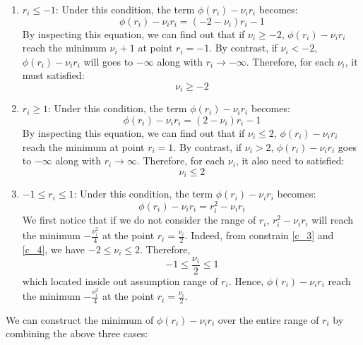 \documentclass[10pt,a4paper]{article}
\begin{document}
\begin{enumerate}
	\item $r_{i} \leq -1$: Under this condition, the term $\phi(r_{i}) - \nu_{i} r_{i}$ becomes:
	\begin{equation*}
		\phi(r_{i}) - \nu_{i} r_{i} = (-2 - \nu_{i}) r_{i} - 1
	\end{equation*}
	By inspecting this equation, we can find out that if $\nu_{i} \geq -2$, $\phi(r_{i}) - \nu_{i} r_{i}$ reach the minimum $\nu_{i} + 1$ at point $r_{i} = -1$. By contrast, if $\nu_{i} < -2$, $\phi(r_{i}) - \nu_{i} r_{i}$ will goes to $-\infty$ along with $r_{i} \rightarrow -\infty$. Therefore, for each $\nu_{i}$, it must satisfied:
	\begin{equation}
		\nu_{i} \geq -2
		\label{c_3}
	\end{equation}
	\item $r_{i} \geq 1$: Under this condition, the  term $\phi(r_{i}) - \nu_{i} r_{i}$ becomes:
	\begin{equation*}
		\phi(r_{i}) - \nu_{i} r_{i} = (2 - \nu_{i})r_{i} - 1
	\end{equation*}
	By inspecting this equation, we can find out that if $\nu_{i} \leq 2$, $\phi(r_{i}) - \nu_{i} r_{i}$ reach the minimum at point $r_{i} = 1$. By contrast, if $\nu_{i} > 2$, $\phi(r_{i}) - \nu_{i} r_{i}$ goes to $-\infty$ along with $r_{i} \rightarrow \infty$. Therefore, for each $\nu_{i}$, it also need to satisfied:
	\begin{equation}
		\nu_{i} \leq 2
		\label{c_4}
	\end{equation}
	\item $-1 \leq r_{i} \leq 1$: Under this condition, the term $\phi(r_{i}) - \nu_{i} r_{i}$ becomes:
	\begin{equation}
		\phi(r_{i}) - \nu_{i} r_{i} = r_{i}^{2} - \nu_{i} r_{i}
	\end{equation}
	We first notice that if we do not consider the range of $r_{i}$, $r_{i}^{2} - \nu_{i} r_{i}$ will reach the minimum $-\frac{\nu_{i}^{2}}{4}$ at the point $r_{i} = \frac{\nu_{i}}{2}$. Indeed, from constrain \ref{c_3} and \ref{c_4}, we have $-2 \leq \nu_{i} \leq 2$. Therefore, 
	\begin{equation*}
		-1 \leq \frac{\nu_{i}}{2} \leq 1
	\end{equation*}
	which located inside out assumption range of $r_{i}$. Hence, $\phi(r_{i}) - \nu_{i} r_{i}$ reach the minimum $-\frac{\nu_{i}^{2}}{4}$ at the point $r_{i} = \frac{\nu_{i}}{2}$.
\end{enumerate}
We can construct the minimum of $\phi(r_{i}) - \nu_{i} r_{i}$ over the entire range of $r_{i}$ by combining the above three cases:
\end{document}

